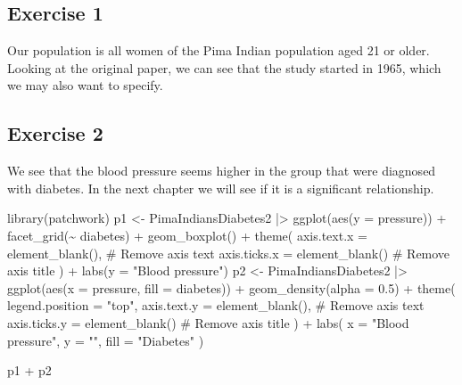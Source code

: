 \documentclass[
  letterpaper,
  DIV=11,
  numbers=noendperiod]{scrreprt}
\newenvironment{Shaded}{\begin{snugshade}}{\end{snugshade}}
\newcommand{\AttributeTok}[1]{\textcolor[rgb]{0.40,0.45,0.13}{#1}}
\newcommand{\CommentTok}[1]{\textcolor[rgb]{0.37,0.37,0.37}{#1}}
\newcommand{\FloatTok}[1]{\textcolor[rgb]{0.68,0.00,0.00}{#1}}
\newcommand{\FunctionTok}[1]{\textcolor[rgb]{0.28,0.35,0.67}{#1}}
\newcommand{\NormalTok}[1]{\textcolor[rgb]{0.00,0.23,0.31}{#1}}
\newcommand{\OtherTok}[1]{\textcolor[rgb]{0.00,0.23,0.31}{#1}}
\newcommand{\SpecialCharTok}[1]{\textcolor[rgb]{0.37,0.37,0.37}{#1}}
\newcommand{\StringTok}[1]{\textcolor[rgb]{0.13,0.47,0.30}{#1}}
\begin{document}
\subsection{Exercise 1}\label{exercise-1-31}

Our population is all women of the Pima Indian population aged 21 or
older. Looking at the original paper, we can see that the study started
in 1965, which we may also want to specify.

\subsection{Exercise 2}\label{exercise-2-29}

We see that the blood pressure seems higher in the group that were
diagnosed with diabetes. In the next chapter we will see if it is a
significant relationship.

\begin{Shaded}
\begin{Highlighting}[]
\FunctionTok{library}\NormalTok{(patchwork)}
\NormalTok{p1 }\OtherTok{\textless{}{-}}\NormalTok{ PimaIndiansDiabetes2 }\SpecialCharTok{|\textgreater{}}
  \FunctionTok{ggplot}\NormalTok{(}\FunctionTok{aes}\NormalTok{(}\AttributeTok{y =}\NormalTok{ pressure)) }\SpecialCharTok{+} 
  \FunctionTok{facet\_grid}\NormalTok{(}\SpecialCharTok{\textasciitilde{}}\NormalTok{ diabetes) }\SpecialCharTok{+}
  \FunctionTok{geom\_boxplot}\NormalTok{() }\SpecialCharTok{+}
  \FunctionTok{theme}\NormalTok{(}
    \AttributeTok{axis.text.x =} \FunctionTok{element\_blank}\NormalTok{(),  }\CommentTok{\# Remove axis text}
    \AttributeTok{axis.ticks.x =} \FunctionTok{element\_blank}\NormalTok{()  }\CommentTok{\# Remove axis title}
\NormalTok{  ) }\SpecialCharTok{+}
  \FunctionTok{labs}\NormalTok{(}\AttributeTok{y =} \StringTok{"Blood pressure"}\NormalTok{)}
\NormalTok{p2 }\OtherTok{\textless{}{-}}\NormalTok{ PimaIndiansDiabetes2 }\SpecialCharTok{|\textgreater{}}
  \FunctionTok{ggplot}\NormalTok{(}\FunctionTok{aes}\NormalTok{(}\AttributeTok{x =}\NormalTok{ pressure, }\AttributeTok{fill =}\NormalTok{ diabetes)) }\SpecialCharTok{+} 
  \FunctionTok{geom\_density}\NormalTok{(}\AttributeTok{alpha =} \FloatTok{0.5}\NormalTok{) }\SpecialCharTok{+}
  \FunctionTok{theme}\NormalTok{(}
    \AttributeTok{legend.position =} \StringTok{"top"}\NormalTok{,}
    \AttributeTok{axis.text.y =} \FunctionTok{element\_blank}\NormalTok{(),  }\CommentTok{\# Remove axis text}
    \AttributeTok{axis.ticks.y =} \FunctionTok{element\_blank}\NormalTok{()  }\CommentTok{\# Remove axis title}
\NormalTok{  ) }\SpecialCharTok{+}
  \FunctionTok{labs}\NormalTok{(}
    \AttributeTok{x =} \StringTok{"Blood pressure"}\NormalTok{,}
    \AttributeTok{y =} \StringTok{""}\NormalTok{,}
    \AttributeTok{fill =} \StringTok{"Diabetes"}
\NormalTok{    )}

\NormalTok{p1 }\SpecialCharTok{+}\NormalTok{ p2}
\end{Highlighting}
\end{Shaded}
\end{document}
